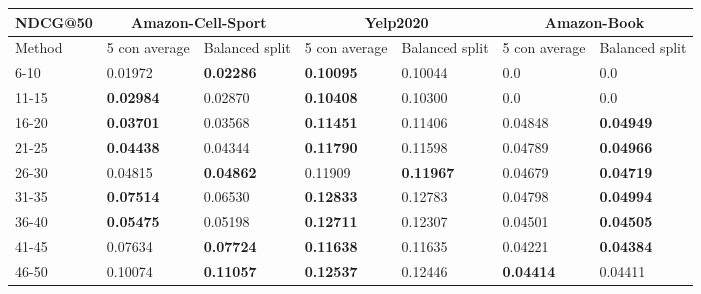 \begin{table*}[h!]
    \centering
    \begin{tabular}{|l|l|l||l|l||l|l|}
        \hline
        NDCG@50  & \multicolumn{2}{c||}{Amazon-Cell-Sport} & \multicolumn{2}{c||}{Yelp2020} & \multicolumn{2}{c|}{Amazon-Book}                                                          \\ \hline
        Method   & 5 con average                           & Balanced split                 & 5 con average                    & Balanced split   & 5 con average    & Balanced split   \\ \hline
        6-10     & 0.01972                                 & \textbf{0.02286}               & \textbf{0.10095}                 & 0.10044          & 0.0              & 0.0              \\ \hline
        11-15    & \textbf{0.02984}                        & 0.02870                        & \textbf{0.10408}                 & 0.10300          & 0.0              & 0.0              \\ \hline
        16-20    & \textbf{0.03701}                        & 0.03568                        & \textbf{0.11451}                 & 0.11406          & 0.04848          & \textbf{0.04949} \\ \hline
        21-25    & \textbf{0.04438}                        & 0.04344                        & \textbf{0.11790}                 & 0.11598          & 0.04789          & \textbf{0.04966} \\ \hline
        26-30    & 0.04815                                 & \textbf{0.04862}               & 0.11909                          & \textbf{0.11967} & 0.04679          & \textbf{0.04719} \\ \hline
        31-35    & \textbf{0.07514}                        & 0.06530                        & \textbf{0.12833}                 & 0.12783          & 0.04798          & \textbf{0.04994} \\ \hline
        36-40    & \textbf{0.05475}                        & 0.05198                        & \textbf{0.12711}                 & 0.12307          & 0.04501          & \textbf{0.04505} \\ \hline
        41-45    & 0.07634                                 & \textbf{0.07724}               & \textbf{0.11638}                 & 0.11635          & 0.04221          & \textbf{0.04384} \\ \hline
        46-50    & 0.10074                                 & \textbf{0.11057}               & \textbf{0.12537}                 & 0.12446          & \textbf{0.04414} & 0.04411          \\ \hline

\end{tabular}
\end{table*}
